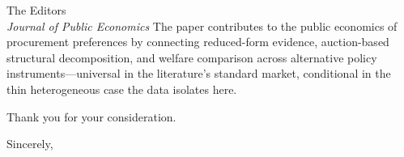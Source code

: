 \documentclass[11pt]{letter}
\begin{document}
\begin{letter}{The Editors\\\emph{Journal of Public Economics}}
The paper contributes to the public economics of procurement preferences by connecting reduced-form evidence, auction-based structural decomposition, and welfare comparison across alternative policy instruments---universal in the literature's standard market, conditional in the thin heterogeneous case the data isolates here.

Thank you for your consideration.

\closing{Sincerely,}

\end{letter}
\end{document}

